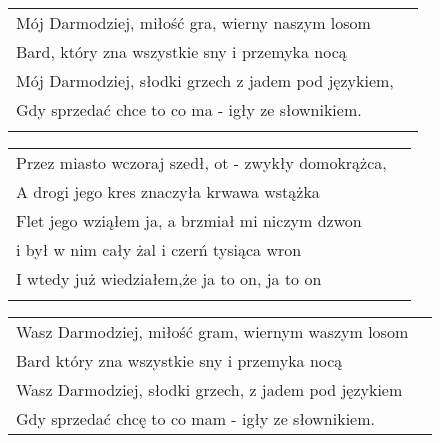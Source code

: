 \documentclass[a5paper]{article}
\begin{document}
\noindent
\begin{tabular}{@{}p{8.5cm}p{3cm}@{}}
Mój Darmodziej, miłość gra, wierny naszym losom \\
Bard, który zna wszystkie sny i przemyka nocą \\
Mój Darmodziej, słodki grzech z jadem pod językiem, \\
Gdy sprzedać chce to co ma - igły ze słownikiem. \\ \\
\end{tabular}

\noindent
\begin{tabular}{@{}p{8.5cm}p{3cm}@{}}
Przez miasto wczoraj szedł, ot - zwykły domokrążca, \\
A drogi jego kres znaczyła krwawa wstążka \\
Flet jego wziąłem ja, a brzmiał mi niczym dzwon \\
i był w nim cały żal i czerń tysiąca wron \\
I wtedy już wiedziałem,że ja to on, ja to on \\ \\
\end{tabular}

\noindent
\begin{tabular}{@{}p{8.5cm}p{3cm}@{}}
Wasz Darmodziej, miłość gram, wiernym waszym losom \\
Bard który zna wszystkie sny i przemyka nocą \\
Wasz Darmodziej, słodki grzech, z jadem pod językiem \\
Gdy sprzedać chcę to co mam - igły ze słownikiem.
\end{tabular}
\end{document}
